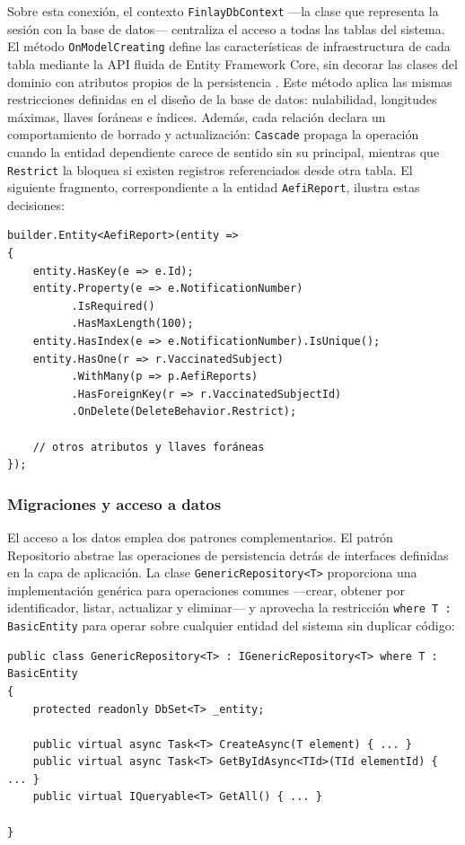 Sobre esta conexión, el contexto \texttt{FinlayDbContext} —la clase que representa la sesión con la base de datos— centraliza el acceso a todas las tablas del sistema. 
El método \texttt{OnModelCreating} define las características de infraestructura de cada tabla mediante la API fluida de Entity Framework Core, sin decorar las clases del dominio con atributos propios de la persistencia \cite{microsoft_efcore}.
Este método aplica las mismas restricciones definidas en el diseño de la base de datos: nulabilidad, longitudes máximas, llaves foráneas e índices.
Además, cada relación declara un comportamiento de borrado y actualización: \texttt{Cascade} propaga la operación cuando la entidad dependiente carece de sentido sin su principal, mientras que \texttt{Restrict} la bloquea si existen registros referenciados desde otra tabla. 
El siguiente fragmento, correspondiente a la entidad \texttt{AefiReport}, ilustra estas decisiones:

\begin{lstlisting}[language={[Sharp]C}, caption={Configuración de infraestructura para AefiReport}, label={lst:fluentapi}]
builder.Entity<AefiReport>(entity =>
{
    entity.HasKey(e => e.Id);
    entity.Property(e => e.NotificationNumber)
          .IsRequired()
          .HasMaxLength(100);
    entity.HasIndex(e => e.NotificationNumber).IsUnique();
    entity.HasOne(r => r.VaccinatedSubject)
          .WithMany(p => p.AefiReports)
          .HasForeignKey(r => r.VaccinatedSubjectId)
          .OnDelete(DeleteBehavior.Restrict);

    // otros atributos y llaves foráneas
});
\end{lstlisting}


\subsubsection{Migraciones y acceso a datos}

El acceso a los datos emplea dos patrones complementarios.
El patrón Repositorio abstrae las operaciones de persistencia detrás de interfaces definidas en la capa de aplicación. 
La clase \texttt{GenericRepository<T>} proporciona una implementación genérica para operaciones comunes —crear, obtener por identificador, listar, actualizar y eliminar— y aprovecha la restricción \texttt{where T : BasicEntity} para operar sobre cualquier entidad del sistema sin duplicar código:

\begin{lstlisting}[language={[Sharp]C}, caption={Repositorio genérico}, label={lst:genericrepository}]
public class GenericRepository<T> : IGenericRepository<T> where T : BasicEntity
{
    protected readonly DbSet<T> _entity;

    public virtual async Task<T> CreateAsync(T element) { ... }
    public virtual async Task<T> GetByIdAsync<TId>(TId elementId) { ... }
    public virtual IQueryable<T> GetAll() { ... }

}
\end{lstlisting}

